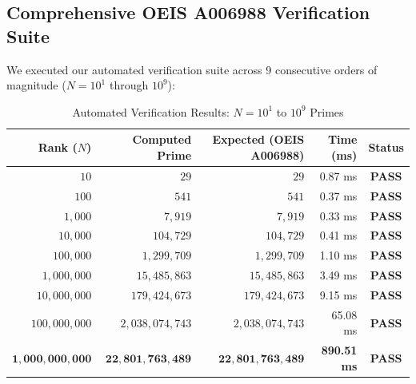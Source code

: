 \documentclass[11pt,a4paper]{article}
\begin{document}
\subsection{Comprehensive OEIS A006988 Verification Suite}
We executed our automated verification suite across 9 consecutive orders of magnitude ($N = 10^1$ through $10^9$):

\begin{table}[htbp]
\centering
\small
\caption{Automated Verification Results: $N = 10^1$ to $10^9$ Primes}
\label{tab:test_results}
\begin{tabular}{r r r r c}
\toprule
\textbf{Rank ($N$)} & \textbf{Computed Prime} & \textbf{Expected (OEIS A006988)} & \textbf{Time (ms)} & \textbf{Status} \\
\midrule
$10$ & $29$ & $29$ & 0.87 ms & \textcolor{passgreen}{\textbf{PASS}} \\
$100$ & $541$ & $541$ & 0.37 ms & \textcolor{passgreen}{\textbf{PASS}} \\
$1,000$ & $7,919$ & $7,919$ & 0.33 ms & \textcolor{passgreen}{\textbf{PASS}} \\
$10,000$ & $104,729$ & $104,729$ & 0.41 ms & \textcolor{passgreen}{\textbf{PASS}} \\
$100,000$ & $1,299,709$ & $1,299,709$ & 1.10 ms & \textcolor{passgreen}{\textbf{PASS}} \\
$1,000,000$ & $15,485,863$ & $15,485,863$ & 3.49 ms & \textcolor{passgreen}{\textbf{PASS}} \\
$10,000,000$ & $179,424,673$ & $179,424,673$ & 9.15 ms & \textcolor{passgreen}{\textbf{PASS}} \\
$100,000,000$ & $2,038,074,743$ & $2,038,074,743$ & 65.08 ms & \textcolor{passgreen}{\textbf{PASS}} \\
$\mathbf{1,000,000,000}$ & $\mathbf{22,801,763,489}$ & $\mathbf{22,801,763,489}$ & \textbf{890.51 ms} & \textcolor{passgreen}{\textbf{PASS}} \\
\bottomrule
\end{tabular}
\end{table}
\end{document}
